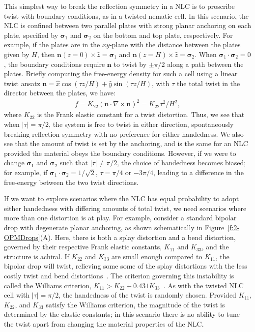 This simplest way to break the reflection symmetry in a NLC is to proscribe twist with boundary conditions, as in a twisted nematic cell.
In this scenario, the NLC is confined between two parallel plates with strong planar anchoring on each plate, specified by $\bm{\sigma}_1$ and $\bm{\sigma}_2$ on the bottom and top plate, respectively.
For example, if the plates are in the $xy$-plane with the distance between the plates given by $H$, then $\mathbf{n}(z = 0) \times \hat{z} = \bm{\sigma}_1$ and $\mathbf{n}(z = H) \times \hat{z} = \bm{\sigma}_2$.
When $\bm{\sigma}_1 \cdot \bm{\sigma}_2 = 0$, the boundary conditions require $\mathbf{n}$ to twist by $\pm \pi/2$ along a path between the plates.
Briefly computing the free-energy density for such a cell using a linear twist ansatz $\mathbf{n} = \hat{x} \cos (\tau z/H) + \hat{y} \sin(\tau z/H)$, with $\tau$ the total twist in the director between the plates, we have:
\begin{align}
  f = K_{22}(\mathbf{n} \cdot \nabla \times \mathbf{n})^2 = K_{22}\tau^2/H^2,
\end{align}
where $K_{22}$ is the Frank elastic constant for a twist distortion.
Thus, we see that when $|\tau| = \pi/2$, the system is free to twist in either direction, spontaneously breaking reflection symmetry with no preference for either handedness.
We also see that the amount of twist is set by the anchoring, and is the same for an NLC provided the material obeys the boundary conditions.
However, if we were to change $\bm{\sigma}_1$ and $\bm{\sigma}_2$ such that $|\tau| \neq \pi/2$, the choice of handedness becomes biased; for example, if $\bm{\sigma}_1 \cdot \bm{\sigma}_2 = 1/\sqrt{2}$, $\tau = \pi/4$ or $-3\pi/4$, leading to a difference in the free-energy between the two twist directions.

If we want to explore scenarios where the NLC has equal probability to adopt either handedness with differing amounts of total twist, we need scenarios where more than one distortion is at play.
For example, consider a standard bipolar drop with degenerate planar anchoring, as shown schematically in Figure~\ref{f:2-OPMDrops}(A).
Here, there is both a splay distortion and a bend distortion, governed by their respective Frank elastic constants, $K_{11}$ and $K_{33}$, and the structure is achiral.
If $K_{22}$ and $K_{33}$ are small enough compared to $K_{11}$, the bipolar drop will twist, relieving some some of the splay distortions with the less costly twist and bend distortions~\cite{RN297,RN296,RN295}.
The criterion governing this instability is called the Williams criterion, $K_{11} > K_{22}+ 0.431 K_{33}$~\cite{RN297}.
As with the twisted NLC cell with $|\tau| = \pi/2$, the handedness of the twist is randomly chosen.
Provided $K_{11}$, $K_{22}$, and $K_{33}$ satisfy the Williams criterion, the magnitude of the twist is determined by the elastic constants; in this scenario there is no ability to tune the twist apart from changing the material properties of the NLC.

